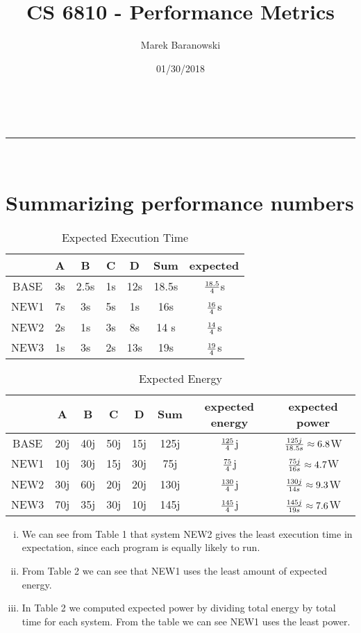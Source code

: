 \documentclass[a4paper,11pt]{article}
\makeatletter
\newcommand{\linia}{\rule{\linewidth}{0.5pt}}
\theoremstyle{mytheor}
\renewcommand{\maketitle}{
\begin{center}
\vspace{2ex}
{\huge \textsc{\@title}}
\vspace{1ex}
\\
\linia\\
\@author \hfill \@date
\vspace{4ex}
\end{center}
}
\makeatother
\begin{document}
\title{CS 6810 - Performance Metrics}

\author{Marek Baranowski}

\date{01/30/2018}

\maketitle
\section{Summarizing performance numbers}
\begin{table}[H]
\caption{Expected Execution Time}
\begin{center}
\begin{tabular}{|c|c|c|c|c|c|c|}
\hline
& A & B & C & D & Sum & expected\\
\hline
BASE & 3s & 2.5s & 1s & 12s & 18.5s & ${18.5}\over{4}$s\\
NEW1 & 7s & 3s & 5s & 1s & 16s & $16\over4$s\\
NEW2 & 2s & 1s & 3s & 8s & 14
s & $14\over4$s\\
NEW3 & 1s & 3s & 2s & 13s & 19s & $19\over4$s\\
\hline
\end{tabular}
\end{center}
\label{default}
\end{table}%

\begin{table}[H]
\caption{Expected Energy}
\begin{center}
\begin{tabular}{|c|c|c|c|c|c|c|c|}
\hline
& A & B & C & D & Sum & expected energy & expected power\\
\hline
BASE & 20j & 40j & 50j & 15j & 125j & ${125}\over{4}$j&${125j\over18.5s}\approx6.8$W\\
NEW1 & 10j & 30j & 15j & 30j & 75j & ${75}\over{4}$j&${75j\over16s}\approx4.7$W\\
NEW2 & 30j & 60j & 20j & 20j & 130j & ${130}\over{4}$j&${130j\over14s}\approx9.3$W\\
NEW3 & 70j & 35j & 30j & 10j & 145j & ${145}\over{4}$j&${145j\over19s}\approx7.6$W\\
\hline
\end{tabular}
\end{center}
\label{default}
\end{table}%

\begin{enumerate}[i.]
\item We can see from Table 1 that system NEW2 gives the least execution time in expectation, since each program is equally likely to run.
\item From Table 2 we can see that NEW1 uses the least amount of expected energy.
\item In Table 2 we computed expected power by dividing total energy by total time for each system. From the table we can see NEW1 uses the least power.
\end{enumerate}
\end{document}
